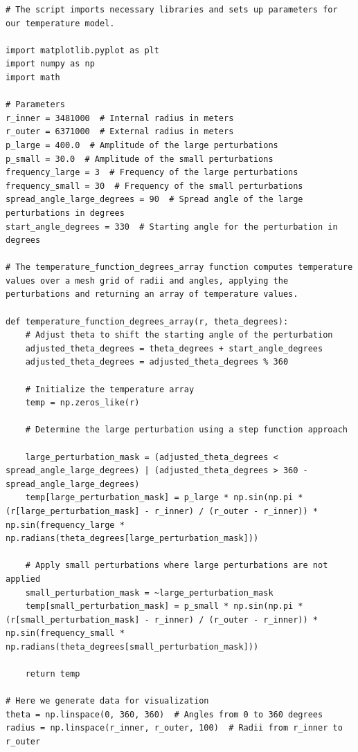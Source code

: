 \documentclass{article}
\begin{document}
\begin{verbatim}
# The script imports necessary libraries and sets up parameters for our temperature model.

import matplotlib.pyplot as plt
import numpy as np
import math

# Parameters
r_inner = 3481000  # Internal radius in meters
r_outer = 6371000  # External radius in meters
p_large = 400.0  # Amplitude of the large perturbations
p_small = 30.0  # Amplitude of the small perturbations
frequency_large = 3  # Frequency of the large perturbations
frequency_small = 30  # Frequency of the small perturbations
spread_angle_large_degrees = 90  # Spread angle of the large perturbations in degrees
start_angle_degrees = 330  # Starting angle for the perturbation in degrees

# The temperature_function_degrees_array function computes temperature values over a mesh grid of radii and angles, applying the perturbations and returning an array of temperature values.

def temperature_function_degrees_array(r, theta_degrees):
    # Adjust theta to shift the starting angle of the perturbation
    adjusted_theta_degrees = theta_degrees + start_angle_degrees
    adjusted_theta_degrees = adjusted_theta_degrees % 360

    # Initialize the temperature array
    temp = np.zeros_like(r)

    # Determine the large perturbation using a step function approach

    large_perturbation_mask = (adjusted_theta_degrees < spread_angle_large_degrees) | (adjusted_theta_degrees > 360 - spread_angle_large_degrees)
    temp[large_perturbation_mask] = p_large * np.sin(np.pi * (r[large_perturbation_mask] - r_inner) / (r_outer - r_inner)) * np.sin(frequency_large * np.radians(theta_degrees[large_perturbation_mask]))

    # Apply small perturbations where large perturbations are not applied
    small_perturbation_mask = ~large_perturbation_mask
    temp[small_perturbation_mask] = p_small * np.sin(np.pi * (r[small_perturbation_mask] - r_inner) / (r_outer - r_inner)) * np.sin(frequency_small * np.radians(theta_degrees[small_perturbation_mask]))

    return temp

# Here we generate data for visualization
theta = np.linspace(0, 360, 360)  # Angles from 0 to 360 degrees
radius = np.linspace(r_inner, r_outer, 100)  # Radii from r_inner to r_outer


\end{verbatim}
\end{document}
